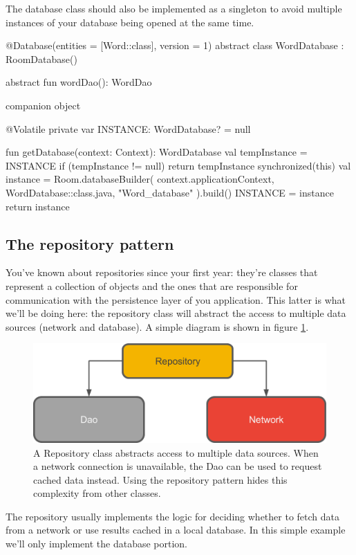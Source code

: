 The database class should also be implemented as a singleton to avoid multiple instances of your database being opened at the same time.

\begin{android}
@Database(entities = [Word::class], version = 1)
abstract class WordDatabase : RoomDatabase() {
	abstract fun wordDao(): WordDao
	
	companion object {
		@Volatile
		private var INSTANCE: WordDatabase? = null
		
		fun getDatabase(context: Context): WordDatabase {
			val tempInstance = INSTANCE
			if (tempInstance != null) {
				return tempInstance
			}
			synchronized(this) {
				val instance = Room.databaseBuilder(
					context.applicationContext,
					WordDatabase::class.java,
					"Word_database"
				).build()
				INSTANCE = instance
				return instance
			}
		}
	}
}
\end{android}

\subsection{The repository pattern}
You've known about repositories since your first year: they're classes that represent a collection of objects and the ones that are responsible for communication with the persistence layer of you application. 
This latter is what we'll be doing here: the repository class will abstract the access to multiple data sources (network and database).
A simple diagram is shown in figure \ref{fig:repository}.

\begin{figure}
	\centering
	\includegraphics[width=0.7\linewidth]{images/persistency/repository}
	\caption{A Repository class abstracts access to multiple data sources.
		When a network connection is unavailable, the Dao can be used to request cached data instead.
		Using the repository pattern hides this complexity from other classes.}
	\label{fig:repository}
\end{figure}

The repository usually implements the logic for deciding whether to fetch data from a network or use results cached in a local database.
In this simple example we'll only implement the database portion. 

